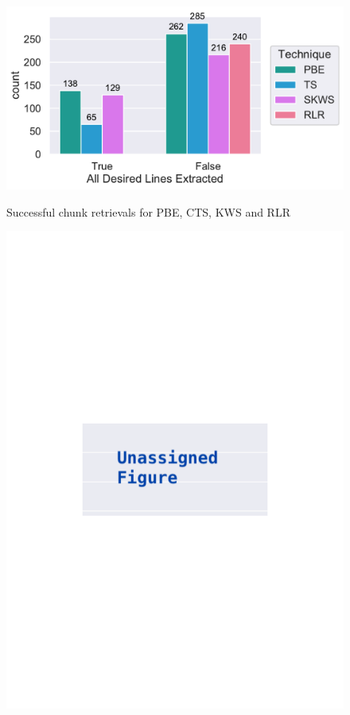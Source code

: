 \documentclass[\myrootdir/main.tex]{subfiles}
\begin{document}
\begin{figure}[htbp]
	\centering
	\begin{minipage}{0.45\textwidth}
		\centering
		\includegraphics[width=\textwidth, clip]{img/big-study/success-all.pdf}
		\caption{Successful chunk retrievals for PBE, CTS, KWS and RLR}
		\label{fig:success-all}
	\end{minipage}\hfill
	\begin{minipage}{0.45\textwidth}
		\centering
		\includegraphics[width=\textwidth, clip]{img/big-study/xxx.pdf}
		\caption{}
		\label{fig:xxx}
	\end{minipage}
\end{figure}
\end{document}
